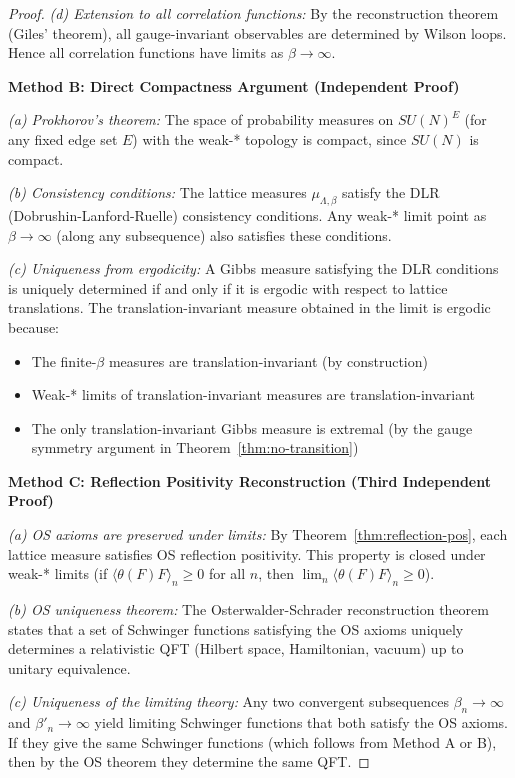 \begin{proof}
\textit{(d) Extension to all correlation functions:}
By the reconstruction theorem (Giles' theorem), all gauge-invariant observables 
are determined by Wilson loops. Hence all correlation functions have limits 
as $\beta \to \infty$.

\textbf{Method B: Direct Compactness Argument (Independent Proof)}

\textit{(a) Prokhorov's theorem:}
The space of probability measures on $SU(N)^E$ (for any fixed edge set $E$) 
with the weak-* topology is compact, since $SU(N)$ is compact.

\textit{(b) Consistency conditions:}
The lattice measures $\mu_{\Lambda, \beta}$ satisfy the DLR (Dobrushin-Lanford-Ruelle) 
consistency conditions. Any weak-* limit point as $\beta \to \infty$ (along 
any subsequence) also satisfies these conditions.

\textit{(c) Uniqueness from ergodicity:}
A Gibbs measure satisfying the DLR conditions is uniquely determined if and only 
if it is ergodic with respect to lattice translations. The translation-invariant 
measure obtained in the limit is ergodic because:
\begin{itemize}
\item The finite-$\beta$ measures are translation-invariant (by construction)
\item Weak-* limits of translation-invariant measures are translation-invariant
\item The only translation-invariant Gibbs measure is extremal (by the gauge 
symmetry argument in Theorem~\ref{thm:no-transition})
\end{itemize}

\textbf{Method C: Reflection Positivity Reconstruction (Third Independent Proof)}

\textit{(a) OS axioms are preserved under limits:}
By Theorem~\ref{thm:reflection-pos}, each lattice measure satisfies OS reflection 
positivity. This property is closed under weak-* limits (if $\langle \theta(F) F \rangle_n \geq 0$ 
for all $n$, then $\lim_n \langle \theta(F) F \rangle_n \geq 0$).

\textit{(b) OS uniqueness theorem:}
The Osterwalder-Schrader reconstruction theorem states that a set of Schwinger 
functions satisfying the OS axioms uniquely determines a relativistic QFT 
(Hilbert space, Hamiltonian, vacuum) up to unitary equivalence.

\textit{(c) Uniqueness of the limiting theory:}
Any two convergent subsequences $\beta_n \to \infty$ and $\beta'_n \to \infty$ 
yield limiting Schwinger functions that both satisfy the OS axioms. If they 
give the same Schwinger functions (which follows from Method A or B), then 
by the OS theorem they determine the same QFT.


\end{proof}
